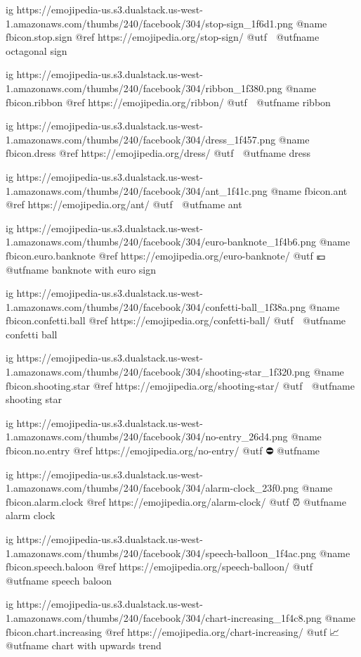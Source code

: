   ig https://emojipedia-us.s3.dualstack.us-west-1.amazonaws.com/thumbs/240/facebook/304/stop-sign_1f6d1.png
  @name fbicon.stop.sign
  @ref https://emojipedia.org/stop-sign/
  @utf 🛑
  @utfname octagonal sign

  ig https://emojipedia-us.s3.dualstack.us-west-1.amazonaws.com/thumbs/240/facebook/304/ribbon_1f380.png
  @name fbicon.ribbon
  @ref https://emojipedia.org/ribbon/
  @utf 🎀
  @utfname ribbon

  ig https://emojipedia-us.s3.dualstack.us-west-1.amazonaws.com/thumbs/240/facebook/304/dress_1f457.png
  @name fbicon.dress
  @ref https://emojipedia.org/dress/
  @utf 👗
  @utfname dress

  ig https://emojipedia-us.s3.dualstack.us-west-1.amazonaws.com/thumbs/240/facebook/304/ant_1f41c.png
  @name fbicon.ant
  @ref https://emojipedia.org/ant/
  @utf 🐜
  @utfname ant

  ig https://emojipedia-us.s3.dualstack.us-west-1.amazonaws.com/thumbs/240/facebook/304/euro-banknote_1f4b6.png
  @name fbicon.euro.banknote
  @ref https://emojipedia.org/euro-banknote/
  @utf 💶
  @utfname banknote with euro sign

  ig https://emojipedia-us.s3.dualstack.us-west-1.amazonaws.com/thumbs/240/facebook/304/confetti-ball_1f38a.png
  @name fbicon.confetti.ball
  @ref https://emojipedia.org/confetti-ball/
  @utf 🎊
  @utfname confetti ball

  ig https://emojipedia-us.s3.dualstack.us-west-1.amazonaws.com/thumbs/240/facebook/304/shooting-star_1f320.png
  @name fbicon.shooting.star
  @ref https://emojipedia.org/shooting-star/
  @utf 🌠
  @utfname shooting star

  ig https://emojipedia-us.s3.dualstack.us-west-1.amazonaws.com/thumbs/240/facebook/304/no-entry_26d4.png
  @name fbicon.no.entry
  @ref https://emojipedia.org/no-entry/
  @utf ⛔️
  @utfname

  ig https://emojipedia-us.s3.dualstack.us-west-1.amazonaws.com/thumbs/240/facebook/304/alarm-clock_23f0.png
  @name fbicon.alarm.clock
  @ref https://emojipedia.org/alarm-clock/
  @utf ⏰
  @utfname alarm clock

  ig https://emojipedia-us.s3.dualstack.us-west-1.amazonaws.com/thumbs/240/facebook/304/speech-balloon_1f4ac.png
  @name fbicon.speech.baloon
  @ref https://emojipedia.org/speech-balloon/
  @utf 💬
  @utfname speech baloon



  ig https://emojipedia-us.s3.dualstack.us-west-1.amazonaws.com/thumbs/240/facebook/304/chart-increasing_1f4c8.png
  @name fbicon.chart.increasing
  @ref https://emojipedia.org/chart-increasing/
  @utf 📈
  @utfname chart with upwards trend


